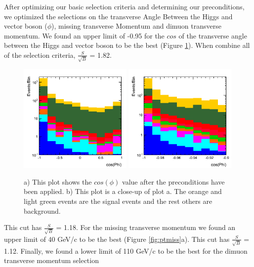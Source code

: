 \documentclass[12pt]{article}
\begin{document}
After optimizing our basic selection criteria and determining our preconditions, 
we optimized the selections on the transverse Angle Between the Higgs and vector boson ($\phi$), missing transverse Momentum and dimuon transverse momentum. 
We found an upper limit of -0.95 for the $cos$ of the transverse angle between the Higgs and vector boson to be the best (Figure \ref{fig:cosPhi}).
When combine all of the selection criteria, $\frac{S}{\sqrt{B}} $ = 1.82.
\begin{figure}[!hbtp]
\begin{center}
    \includegraphics[width=0.49\textwidth]{images/Hist_MuMu2JetPhiBeforeCuts.png} %
    \includegraphics[width=0.49\textwidth]{images/Hist_MuMu2JetPhiZoomB4Cut.png}
    \caption{ \label{fig:cosPhi}
         a) This plot shows the $cos(\phi)$ value after the preconditions have been applied. b) This plot is a close-up of plot a.
	 The orange and light green events are the signal events and the rest others are background.
      }
\end{center}
\end{figure} 
This cut has $\frac{S}{\sqrt{B}}$ = 1.18. For the missing transverse momentum we found an upper limit of 40 GeV/c to be the best (Figure \ref{fig:ptmiss}a).
This cut has $\frac{S}{\sqrt{B}}$ = 1.12. Finally, we found a lower limit of 110 GeV/c to be the best for the dimuon transverse momentum selection 
\end{document}
